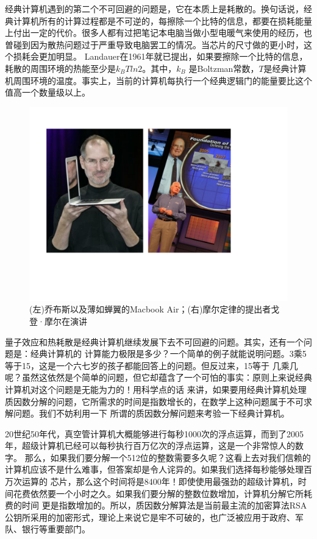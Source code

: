 经典计算机遇到的第二个不可回避的问题是，它在本质上是耗散的。换句话说，经典计算机所有的计算过程都是不可逆的，每擦除一个比特的信息，都要在损耗能量
上付出一定的代价。很多人都有过把笔记本电脑当做小型电暖气来使用的经历，也曽碰到因为散热问题过于严重导致电脑罢工的情况。当芯片的尺寸做的更小时，这个损耗会更加明显。
Landauer在1961年就已提出\cite{Landauer}，如果要擦除一个比特的信息，耗散的周围环境的热能至少是$k_BTln2$。其中，$k_B$ 是Boltzman常数，$T$是经典计算机周围环境的温度。事实上，当前的计算机每执行一个经典逻辑门的能量要比这个值高一个数量级以上。
        \begin{figure}[htbp]
            \begin{center}
              \includegraphics[width= 0.8\columnwidth]{figures/jobs.pdf}
              \caption{(左)乔布斯以及薄如蝉翼的Macbook Air；(右)摩尔定律的提出者戈登·摩尔在演讲
              }
              \label{jobs}
            \end{center}
        \end{figure}

    量子效应和热耗散是经典计算机继续发展下去不可回避的问题。其实，还有一个问题是：经典计算机的
    计算能力极限是多少？一个简单的例子就能说明问题。3乘5等于15，这是一个六七岁的孩子都能回答上的问题。但反过来，15等于
    几乘几呢？虽然这依然是个简单的问题，但它却蕴含了一个可怕的事实：原则上来说经典计算机对这个问题是无能为力的！用科学点的话
    来讲，如果要用经典计算机处理质因数分解的问题，它所需求的时间是指数增长的，在数学上这种问题属于不可求解问题。我们不妨利用一下
    所谓的质因数分解问题来考验一下经典计算机。

    20世纪50年代，真空管计算机大概能够进行每秒1000次的浮点运算，而到了2005年，超级计算机已经可以每秒执行百万亿次的浮点运算，这是一个非常惊人的数字。
    那么，如果我们要分解一个512位的整数需要多久呢？这看上去对我们信赖的计算机应该不是什么难事，但答案却是令人诧异的。如果我们选择每秒能够处理百万次运算的
    芯片，那么这个时间将是8400年！即使使用最强劲的超级计算机，时间花费依然要一个小时之久。如果我们要分解的整数位数增加，计算机分解它所耗费的时间
    更是指数增加的。所以，质因数分解算法是当前最主流的加密算法RSA公钥所采用的加密形式，理论上来说它是牢不可破的，也广泛被应用于政府、军队、银行等重要部门。



